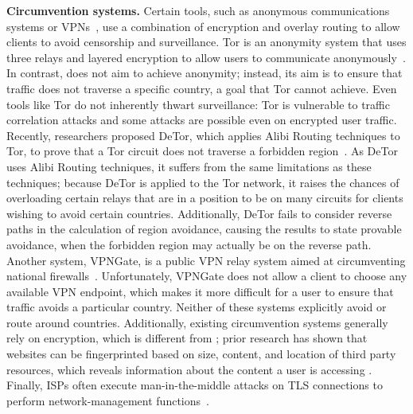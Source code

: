 {\bf Circumvention systems.}  Certain tools, such as anonymous
communications systems or VPNs~\cite{dingledine2004tor,nobori2014vpn,piotrowska2017loopix,van2015vuvuzela,wolinsky2012dissent,tyagi2016stadium,corrigan2015riposte,kwon2016atom,kwon2016riffle,
gelernter2016two}, use a combination of
encryption and overlay routing to allow clients to avoid censorship and surveillance. Tor is
an anonymity system that uses three relays and layered encryption to allow
users to communicate anonymously~\cite{dingledine2004tor}.  In contrast,
\system{} does not aim to achieve anonymity; instead, its aim is to ensure
that traffic does not traverse a specific  country, a goal that Tor cannot
achieve.  Even tools like Tor do not inherently thwart surveillance: Tor is
vulnerable to traffic correlation attacks and some attacks are possible even
on encrypted user traffic. Recently, researchers proposed DeTor, which applies Alibi Routing techniques 
to Tor, to prove that a Tor circuit does not traverse a forbidden region~\cite{levin_detour}. 
As DeTor uses Alibi Routing techniques, it suffers from the same limitations as these 
techniques; because DeTor is applied to the Tor network, it raises the chances of overloading 
certain relays that are in a position to be on many circuits for clients wishing to avoid certain 
countries.  Additionally, DeTor fails to consider 
reverse paths in the calculation of region avoidance, causing the results to state provable 
avoidance, when the forbidden region may actually be on the reverse path.  Another system, VPNGate, is a public VPN relay system aimed at
circumventing national firewalls~\cite{nobori2014vpn}. Unfortunately, VPNGate
does not allow a client to choose any available VPN endpoint, which makes it more
difficult for a user to ensure that traffic avoids a particular country.  
Neither of these systems explicitly avoid or route around countries. Additionally, existing circumvention systems generally rely on
encryption, which is different from \system{}; prior research has shown that
websites can be fingerprinted based on size, content, and location of third
party resources, which  reveals information about the content a user is
accessing \cite{what_isps_can_see}.  Finally, ISPs often execute man-in-the-middle attacks on TLS connections to perform network-management
functions~\cite{mitm_isp}.

